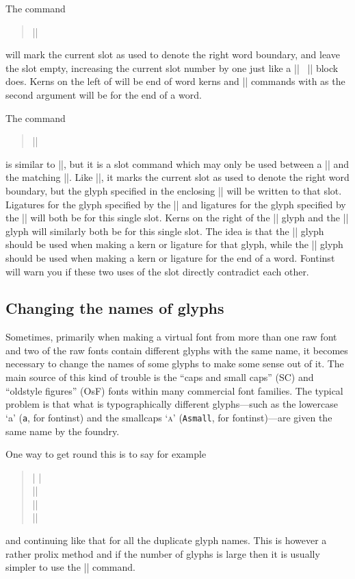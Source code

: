 \documentclass[a4paper]{ltxguide}
\newcommand*{\meta}{\m}
\newcommand*{\marg}{\arg}
\newcommand*{\setpackagename}[1]{\textsf{#1}}
\newcommand{\fontinst}{\setpackagename{font\-inst}\xspace}
\newcommand{\Fontinst}{\setpackagename{Font\-inst}\xspace}
\begin{document}
The command
\begin{quote}
  |\setrightboundary|\marg{glyph}
\end{quote}
will mark the current slot as used to denote the right word boundary, 
and leave the slot empty, increasing the current slot number by one 
just like a |\setslot| \textellipsis\ |\endsetslot| block does. Kerns on 
the left of \meta{glyph} will be end of word kerns and |\ligature| 
commands with \meta{glyph} as the second argument will be for the end 
of a word.

The command
\begin{quote}
  |\makerightboundary|\marg{glyph}
\end{quote}
is similar to |\setrightboundary|, but it is a slot command which may 
only be used between a |\setslot| and the matching |\endsetslot|. Like 
|\setrightboundary|, it marks the current slot as used to denote the 
right word boundary, but the glyph specified in the enclosing |\setslot| 
will be written to that slot. Ligatures for the glyph specified by the 
|\setslot| and ligatures for the glyph specified by the 
|\makerightboundary| will both be for this single slot. Kerns on the 
right of the |\setslot| glyph and the |\makerightboundary| glyph will 
similarly both be for this single slot. The idea is that the |\setslot| 
glyph should be used when making a kern or ligature for that glyph, 
while the |\makerightboundary| glyph should be used when making a kern 
or ligature for the end of a word. \Fontinst will warn you if 
these two uses of the slot directly contradict each other.


\subsection{Changing the names of glyphs}
\label{Ssec:Des:Reglyph}

Sometimes, primarily when making a virtual font from more than one raw 
font and two of the raw fonts contain different glyphs with the same 
name, it becomes necessary to change the names of some glyphs to make 
some sense out of it. The main source of this kind of trouble is the 
``caps and small caps'' (SC) and ``oldstyle figures'' (OsF) fonts 
within many commercial font families. The typical problem is that what 
is typographically different glyphs---such as the lowercase `a' 
(\texttt{a}, for \fontinst) and the smallcaps `\textsc{a}' 
(\texttt{Asmall}, for \fontinst)---are given the same name by 
the foundry. 

One way to get round this is to say for example
\begin{quote}
  |  \endsetglyph|\\
  ||\\
  ||\\
  ||
\end{quote}
and continuing like that for all the duplicate glyph names. This is 
however a rather prolix method and if the number of glyphs is large 
then it is usually simpler to use the |\reglyphfont| command.
\end{document}
